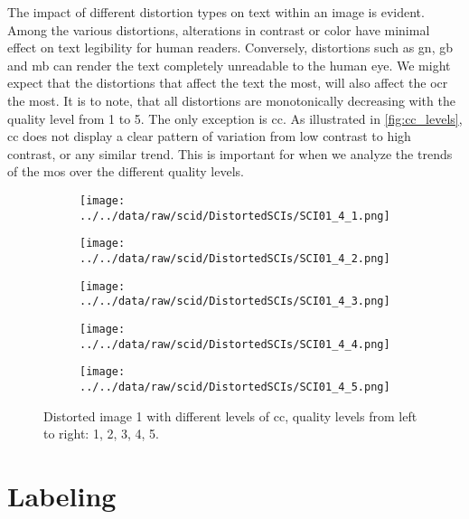 The impact of different distortion types on text within an image is evident.
Among the various distortions, alterations in contrast or color have minimal effect on text legibility for human readers.
Conversely, distortions such as \gls{gn}, \gls{gb} and \gls{mb} can render the text completely unreadable to the human eye.
We might expect that the distortions that affect the text the most, will also affect the \gls{ocr} the most.
It is to note, that all distortions are monotonically decreasing with the quality level from 1 to 5.
The only exception is \gls{cc}.
As illustrated in \autoref{fig:cc_levels}, \gls{cc} does not display a clear pattern of variation from low contrast to high contrast, or any similar trend.
This is important for when we analyze the trends of the \gls{mos} over the different quality levels.

\begin{figure}[h!]
    \centering
    \begin{subfigure}[b]{0.18\textwidth}
        \texttt{[image: ../../data/raw/scid/DistortedSCIs/SCI01\_4\_1.png]}
    \end{subfigure}
    \hfill
    \begin{subfigure}[b]{0.18\textwidth}
        \texttt{[image: ../../data/raw/scid/DistortedSCIs/SCI01\_4\_2.png]}
    \end{subfigure}
    \hfill
    \begin{subfigure}[b]{0.18\textwidth}
        \texttt{[image: ../../data/raw/scid/DistortedSCIs/SCI01\_4\_3.png]}
    \end{subfigure}
    \hfill
    \begin{subfigure}[b]{0.18\textwidth}
        \texttt{[image: ../../data/raw/scid/DistortedSCIs/SCI01\_4\_4.png]}
    \end{subfigure}
    \hfill
    \begin{subfigure}[b]{0.18\textwidth}
        \texttt{[image: ../../data/raw/scid/DistortedSCIs/SCI01\_4\_5.png]}
    \end{subfigure}
    \caption{Distorted image 1 with different levels of \gls{cc}, quality levels from left to right: 1, 2, 3, 4, 5.}
    \label{fig:cc_levels}
\end{figure}
        

\section{Labeling}
\label{sec:dataset_labeling}

